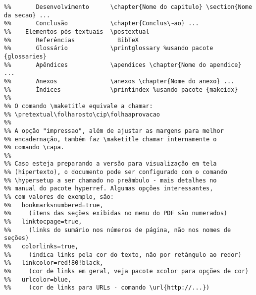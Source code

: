 \begin{verbatim}
%%       Desenvolvimento      \chapter{Nome do capitulo} \section{Nome da secao} ...
%%       Conclusão            \chapter{Conclus\~ao} ...
%%    Elementos pós-textuais  \postextual
%%       Referências            BibTeX
%%       Glossário            \printglossary %usando pacote {glossaries}
%%       Apêndices            \apendices \chapter{Nome do apendice} ...
%%       Anexos               \anexos \chapter{Nome do anexo} ...
%%       Índices              \printindex %usando pacote {makeidx}
%%
%% O comando \maketitle equivale a chamar:
%% \pretextual\folharosto\cip\folhaaprovacao
%%
%% A opção "impressao", além de ajustar as margens para melhor
%% encadernação, também faz \maketitle chamar internamente o
%% comando \capa.
%%
%% Caso esteja preparando a versão para visualização em tela
%% (hipertexto), o documento pode ser configurado com o comando
%% \hypersetup a ser chamado no preâmbulo - mais detalhes no
%% manual do pacote hyperref. Algumas opções interessantes,
%% com valores de exemplo, são:
%%   bookmarksnumbered=true,
%%	   (itens das seções exibidas no menu do PDF são numerados)
%%   linktocpage=true,
%%	   (links do sumário nos números de página, não nos nomes de seções)
%%   colorlinks=true,
%%	   (indica links pela cor do texto, não por retângulo ao redor)
%%   linkcolor=red!80!black,
%%	   (cor de links em geral, veja pacote xcolor para opções de cor)
%%   urlcolor=blue,
%%	   (cor de links para URLs - comando \url{http://...})

\end{verbatim}
